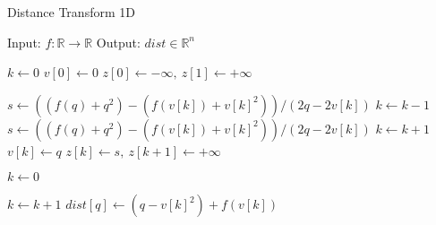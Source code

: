 \documentclass{article}
\begin{document}
\begin{algorithm}
    \caption{Distance Transform 1D}
    \begin{algorithmic}[1]
        \STATE Input: $f: \mathbb{R} \to \mathbb{R}$
        \STATE Output: $dist \in \mathbb{R}^n$

        \STATE $k \gets 0$
        \STATE $v[0] \gets 0$
        \STATE $z[0] \gets -\infty,\ z[1] \gets +\infty$

            \STATE $s \gets ((f(q) + q^2) - (f(v[k]) + v[k]^2)) / (2q-2v[k])$
                \STATE $k \gets k-1$
                \STATE $s \gets ((f(q) + q^2) - (f(v[k]) + v[k]^2)) / (2q-2v[k])$
            \ENDWHILE
            \STATE $k \gets k + 1$
            \STATE $v[k] \gets q$
            \STATE $z[k] \gets s,\ z[k+1] \gets +\infty$
        \ENDFOR

        \STATE $k \gets 0$

                \STATE $k \gets k+1$
            \ENDWHILE
            \STATE $dist[q] \gets (q-v[k]^2) + f(v[k])$
        \ENDFOR
    \end{algorithmic}
\end{algorithm}
\end{document}
